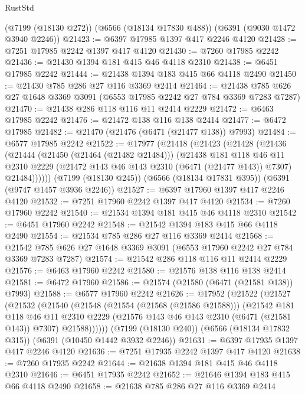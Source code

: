 \begin{lexlean}{RustStd}
\begin{coremodule}
    (@7199 (@18130 @272))
    (@6566 (@18134 @17830 @488))
    (@6391 (@9030 @1472 @3940 @2246))
@21423 := @6397 @17985 @1397 @417 @2246 @4120
@21428 := @7251 @17985 @2242 @1397 @417 @4120
@21430 := @7260 @17985 @2242
@21436 := @21430 @1394 @181 @415 @46 @4118 @2310
@21438 := @6451 @17985 @2242
@21444 := @21438 @1394 @183 @415 @66 @4118 @2490
@21450 := @21430 @785 @286 @27 @116 @3369 @2414
@21464 := @21438 @785 @626 @27 @1648 @3369 @3091 (@6553 @17985 @2242 @27 @784 @3369 @7283 @7287)
@21470 := @21438 @286 @118 @116 @11 @2414 @2229
@21472 := @6463 @17985 @2242
@21476 := @21472 @138 @116 @138 @2414
@21477 := @6472 @17985
@21482 := @21470 (@21476 (@6471 (@21477 @138)) @7993)
@21484 := @6577 @17985 @2242
@21522 := @17977
    (@21418
      (@21423
        (@21428
          (@21436
            (@21444
              (@21450 (@21464 (@21482 @21484)))
              (@21438
                @181
                @118
                @46
                @11
                @2310
                @2229
                (@21472 @143 @46 @143 @2310 (@6471 (@21477 @143)) @7307)
                @21484))))))
    (@7199 (@18130 @245))
    (@6566 (@18134 @17831 @395))
    (@6391 (@9747 @1457 @3936 @2246))
@21527 := @6397 @17960 @1397 @417 @2246 @4120
@21532 := @7251 @17960 @2242 @1397 @417 @4120
@21534 := @7260 @17960 @2242
@21540 := @21534 @1394 @181 @415 @46 @4118 @2310
@21542 := @6451 @17960 @2242
@21548 := @21542 @1394 @183 @415 @66 @4118 @2490
@21554 := @21534 @785 @286 @27 @116 @3369 @2414
@21568 := @21542 @785 @626 @27 @1648 @3369 @3091 (@6553 @17960 @2242 @27 @784 @3369 @7283 @7287)
@21574 := @21542 @286 @118 @116 @11 @2414 @2229
@21576 := @6463 @17960 @2242
@21580 := @21576 @138 @116 @138 @2414
@21581 := @6472 @17960
@21586 := @21574 (@21580 (@6471 (@21581 @138)) @7993)
@21588 := @6577 @17960 @2242
@21626 := @17952
    (@21522
      (@21527
        (@21532
          (@21540
            (@21548
              (@21554 (@21568 (@21586 @21588)))
              (@21542
                @181
                @118
                @46
                @11
                @2310
                @2229
                (@21576 @143 @46 @143 @2310 (@6471 (@21581 @143)) @7307)
                @21588))))))
    (@7199 (@18130 @240))
    (@6566 (@18134 @17832 @315))
    (@6391 (@10450 @1442 @3932 @2246))
@21631 := @6397 @17935 @1397 @417 @2246 @4120
@21636 := @7251 @17935 @2242 @1397 @417 @4120
@21638 := @7260 @17935 @2242
@21644 := @21638 @1394 @181 @415 @46 @4118 @2310
@21646 := @6451 @17935 @2242
@21652 := @21646 @1394 @183 @415 @66 @4118 @2490
@21658 := @21638 @785 @286 @27 @116 @3369 @2414

\end{coremodule}
\end{lexlean}
